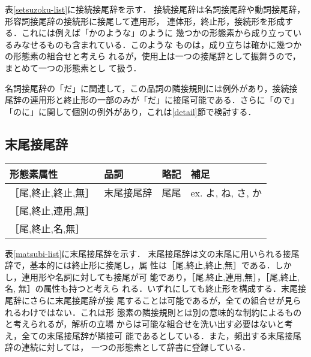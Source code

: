 表\ref{setsuzoku-list}に接続接尾辞を示す．
接続接尾辞は名詞接尾辞や動詞接尾辞，形容詞接尾辞の接続形に接尾して連用形，
連体形，終止形，接続形を形成する．これには例えば「かのような」のように
幾つかの形態素から成り立っているみなせるものも含まれている．このような
ものは，成り立ちは確かに幾つかの形態素の組合せと考えら
れるが，使用上は一つの接尾辞として振舞うので，まとめて一つの形態素とし
て扱う．

名詞接尾辞の「だ」に関連して，この品詞の隣接規則には例外があり，接続接
尾辞の連用形と終止形の一部のみが「だ」に接尾可能である．さらに「ので」
「のに」に関して個別の例外があり，これは\ref{detail}節で検討する．

\subsection{末尾接尾辞}
\begin{table*}
\begin{center}
\begin{tabular}{|l|l|l|l|}
\hline
形態素属性 & 品詞 & 略記 & 補足 \\
\hline
［尾,終止,終止,無］ & 末尾接尾辞 &  尾尾 & ex. よ, ね, さ, か \\
［尾,終止,連用,無］ &&&\\
［尾,終止,名,無］ &&&\\
\hline
\end{tabular}
\end{center}
\caption{末尾接尾辞}
\label{matsubi-list}
\end{table*}

表\ref{matsubi-list}に末尾接尾辞を示す．
末尾接尾辞は文の末尾に用いられる接尾辞で，基本的には終止形に接尾し，属
性は［尾,終止,終止,無］である．しかし，連用形や名詞に対しても接尾が可
能であり，［尾,終止,連用,無］，［尾,終止,名, 無］の属性も持つと考えら
れる．いずれにしても終止形を構成する．末尾接尾辞にさらに末尾接尾辞が接
尾することは可能であるが，全ての組合せが見られるわけではない．これは形
態素の隣接規則とは別の意味的な制約によるものと考えられるが，解析の立場
からは可能な組合せを洗い出す必要はないと考え，全ての末尾接尾辞が隣接可
能であるとしている．また，頻出する末尾接尾辞の連続に対しては，
一つの形態素として辞書に登録している．

